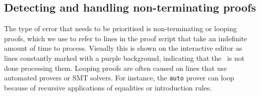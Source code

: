 \documentclass[10pt,conference]{IEEEtran}
\begin{document}
\subsection{Detecting and handling non-terminating proofs}
The type of error that needs to be prioritised is non-terminating or looping proofs, which we use to refer to lines in the proof script that take an indefinite amount of time to process. Visually this is shown on the interactive editor as lines constantly marked with a purple background, indicating that the \pide\ is not done processing them. 
Looping proofs are often caused on lines that use automated provers or SMT solvers. For instance, the \texttt{auto} prover can loop because of recursive applications of equalities or introduction rules.
\end{document}
